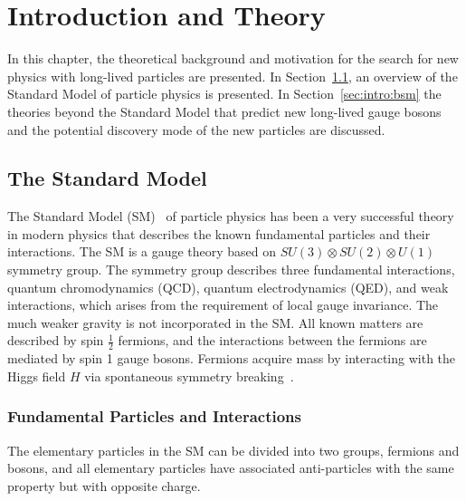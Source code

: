 \chapter{Introduction and Theory}
\label{chap:introduction}

In this chapter, the theoretical background and motivation for the search for new physics with long-lived particles are presented. In Section~\ref{sec:intro:standard_model}, an overview of the Standard Model of particle physics is presented. In Section~\ref{sec:intro:bsm} the theories beyond the Standard Model that predict new long-lived gauge bosons and the potential discovery mode of the new particles are discussed.



\section{The Standard Model}
\label{sec:intro:standard_model}

The Standard Model (SM)~\cite{Burgess:2007zi} of particle physics has been a very successful theory in modern physics that describes the known fundamental particles and their interactions. The SM is a gauge theory based on $SU(3) \otimes SU(2) \otimes U(1)$ symmetry group. The symmetry group describes three fundamental interactions, quantum chromodynamics (QCD), quantum electrodynamics (QED), and weak interactions, which arises from the requirement of local gauge invariance. The much weaker gravity is not incorporated in the SM. All known matters are described by spin $\frac{1}{2}$ fermions, and the interactions between the fermions are mediated by spin 1 gauge bosons. Fermions acquire mass by interacting with the Higgs field $H$ via spontaneous symmetry breaking~\cite{Higgs:1964pj}.

\subsection{Fundamental Particles and Interactions}
\label{sec:intro:fundamental_particles}
The elementary particles in the SM can be divided into two groups, fermions and bosons, and all elementary particles have associated anti-particles with the same property but with opposite charge.

